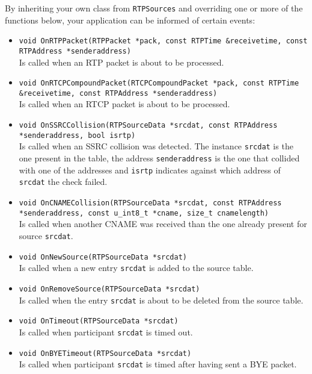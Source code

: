 \documentclass[12pt,a4paper]{article}
\begin{document}
				By inheriting your own class from {\tt RTPSources} and overriding
				one or more of the functions below, your application can be informed
				of certain events:
				\begin{itemize}
					\item {\tt void OnRTPPacket(RTPPacket *pack, const RTPTime \&receivetime,
					                                    const RTPAddress *senderaddress)}\\
						Is called when an RTP packet is about to be processed.
					\item {\tt void OnRTCPCompoundPacket(RTCPCompoundPacket *pack, const RTPTime \&receivetime,
					                                             const RTPAddress *senderaddress)}\\
						Is called when an RTCP packet is about to be processed.
					\item {\tt void OnSSRCCollision(RTPSourceData *srcdat, const RTPAddress *senderaddress, bool isrtp)}\\
						Is called when an SSRC collision was detected. The instance
						{\tt srcdat} is the one present in the table, the address
						{\tt senderaddress} is the one that collided with one of the
						addresses and {\tt isrtp} indicates against which address of
						{\tt srcdat} the check failed.
					\item {\tt void OnCNAMECollision(RTPSourceData *srcdat, const RTPAddress *senderaddress,
					                                         const u\_int8\_t *cname, size\_t cnamelength)}\\
						Is called when another CNAME was received than the one
						already present for source {\tt srcdat}.
					\item {\tt void OnNewSource(RTPSourceData *srcdat)}\\
						Is called when a new entry {\tt srcdat} is added to the source
						table.
					\item {\tt void OnRemoveSource(RTPSourceData *srcdat)}\\
						Is called when the entry {\tt srcdat} is about to be
						deleted from the source table.
					\item {\tt void OnTimeout(RTPSourceData *srcdat)}\\
						Is called when participant {\tt srcdat} is timed out.
					\item {\tt void OnBYETimeout(RTPSourceData *srcdat)}\\
						Is called when participant {\tt srcdat} is timed after
						having sent a BYE packet.

\end{itemize}
\end{document}
